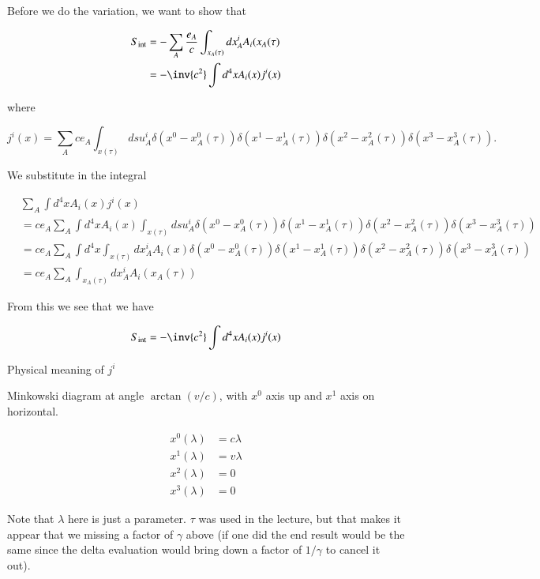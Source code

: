 Before we do the variation, we want to show that

\begin{align*}
S_{\text{int}} 
&= -\sum_A \frac{e_A}{c} \int_{x_A(\tau)} dx^i_A A_i(x_A(\tau) \\
&= -\inv{c^2} \int d^4 x A_i(x) j^i(x) 
\end{align*}

where

\begin{equation}\label{eqn:relativisticElectrodynamicsL12:390}
j^i(x) = 
\sum_A c e_A \int_{x(\tau)}
ds u^i_A 
\delta(x^0 - x^0_A(\tau))
\delta(x^1 - x^1_A(\tau))
\delta(x^2 - x^2_A(\tau))
\delta(x^3 - x^3_A(\tau)).
\end{equation}

We substitute in the integral

\begin{align*}
&\sum_A \int d^4 x A_i(x) j^i(x) \\
&= 
c e_A \sum_A \int d^4 x A_i(x) 
\int_{x(\tau)}
ds u^i_A 
\delta(x^0 - x^0_A(\tau))
\delta(x^1 - x^1_A(\tau))
\delta(x^2 - x^2_A(\tau))
\delta(x^3 - x^3_A(\tau)) \\
&= 
c e_A \sum_A 
\int d^4 x 
\int_{x(\tau)}
dx^i_A 
A_i(x) 
\delta(x^0 - x^0_A(\tau))
\delta(x^1 - x^1_A(\tau))
\delta(x^2 - x^2_A(\tau))
\delta(x^3 - x^3_A(\tau)) \\
&=
c e_A \sum_A 
\int_{x_A(\tau)}
dx^i_A 
A_i(x_A(\tau)) 
\end{align*}

From this we see that we have

\begin{equation}\label{eqn:relativisticElectrodynamicsL12:430}
S_{\text{int}} = -\inv{c^2} \int d^4 x A_i(x) j^i(x) 
\end{equation}

Physical meaning of $j^i$

Minkowski diagram at angle $\arctan(v/c)$, with $x^0$ axis up and $x^1$ axis on horizontal.

\begin{align}\label{eqn:relativisticElectrodynamicsL12:450}
x^0(\lambda) &= c \lambda \\
x^1(\lambda) &= v \lambda \\
x^2(\lambda) &= 0 \\
x^3(\lambda) &= 0
\end{align}

Note that $\lambda$ here is just a parameter.  $\tau$ was used in the lecture, but that makes it appear that we missing a factor of $\gamma$ above (if one did the end result would be the same since the delta evaluation would bring down a factor of $1/\gamma$ to cancel it out).

